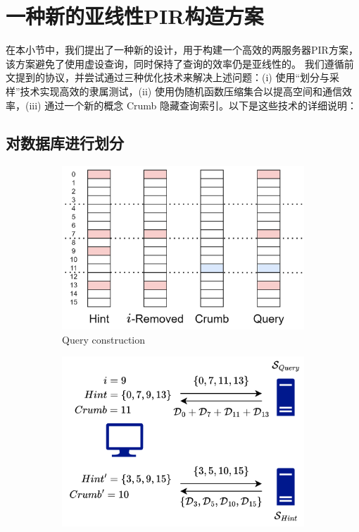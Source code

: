 \section{一种新的亚线性PIR构造方案}
在本小节中，我们提出了一种新的设计，用于构建一个高效的两服务器PIR方案，该方案避免了使用虚设查询，同时保持了查询的效率仍是亚线性的。
我们遵循前文提到的协议，并尝试通过三种优化技术来解决上述问题：(i) 使用“划分与采样”技术实现高效的隶属测试，(ii) 使用伪随机函数压缩集合以提高空间和通信效率，(iii) 通过一个新的概念 Crumb 隐藏查询索引。以下是这些技术的详细说明：
\subsection{对数据库进行划分}

\begin{figure}
    \begin{subfigure}{0.5\textwidth}
        \centering
        \includegraphics[width=0.8\linewidth]{figure/sketch1.png}
        \caption{Query construction} \label{fig:query-a}
    \end{subfigure}%
    \hspace*{\fill}   %
    \begin{subfigure}{0.5\textwidth}
        \centering
        \includegraphics[width=0.8\linewidth]{figure/sketch2.png}

\end{subfigure}
\end{figure}
